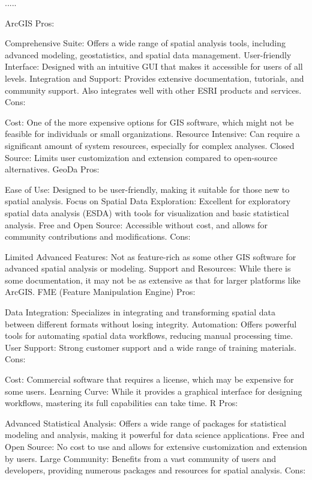 \documentclass[12pt]{article}
\begin{document}
.....

ArcGIS
Pros:

Comprehensive Suite: Offers a wide range of spatial analysis tools, including advanced modeling, geostatistics, and spatial data management.
User-friendly Interface: Designed with an intuitive GUI that makes it accessible for users of all levels.
Integration and Support: Provides extensive documentation, tutorials, and community support. Also integrates well with other ESRI products and services.
Cons:

Cost: One of the more expensive options for GIS software, which might not be feasible for individuals or small organizations.
Resource Intensive: Can require a significant amount of system resources, especially for complex analyses.
Closed Source: Limits user customization and extension compared to open-source alternatives.
GeoDa
Pros:

Ease of Use: Designed to be user-friendly, making it suitable for those new to spatial analysis.
Focus on Spatial Data Exploration: Excellent for exploratory spatial data analysis (ESDA) with tools for visualization and basic statistical analysis.
Free and Open Source: Accessible without cost, and allows for community contributions and modifications.
Cons:

Limited Advanced Features: Not as feature-rich as some other GIS software for advanced spatial analysis or modeling.
Support and Resources: While there is some documentation, it may not be as extensive as that for larger platforms like ArcGIS.
FME (Feature Manipulation Engine)
Pros:

Data Integration: Specializes in integrating and transforming spatial data between different formats without losing integrity.
Automation: Offers powerful tools for automating spatial data workflows, reducing manual processing time.
User Support: Strong customer support and a wide range of training materials.
Cons:

Cost: Commercial software that requires a license, which may be expensive for some users.
Learning Curve: While it provides a graphical interface for designing workflows, mastering its full capabilities can take time.
R
Pros:

Advanced Statistical Analysis: Offers a wide range of packages for statistical modeling and analysis, making it powerful for data science applications.
Free and Open Source: No cost to use and allows for extensive customization and extension by users.
Large Community: Benefits from a vast community of users and developers, providing numerous packages and resources for spatial analysis.
Cons:
\end{document}
